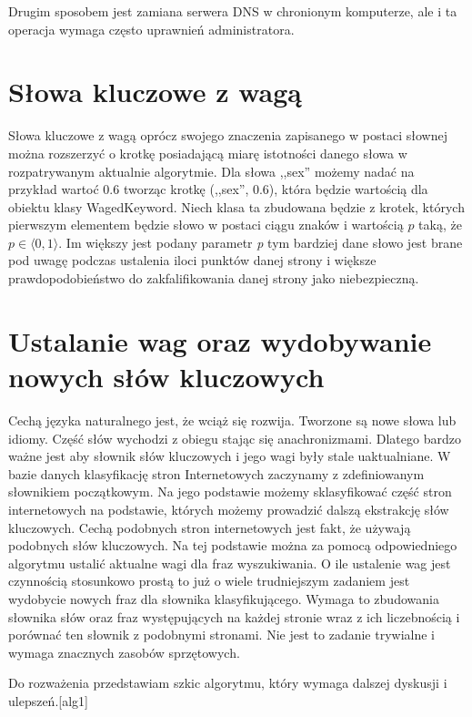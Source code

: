 \documentclass[10pt,twoside,a4paper]{article}
\begin{document}
Drugim sposobem jest zamiana serwera DNS w chronionym komputerze, ale i ta operacja wymaga często uprawnień administratora.
	
\section{Słowa kluczowe z wagą}
Słowa kluczowe z wagą oprócz swojego znaczenia zapisanego w postaci słownej można rozszerzyć o krotkę posiadającą miarę istotności danego słowa w rozpatrywanym aktualnie algorytmie. Dla słowa ,,sex'' możemy nadać na przykład wartoć 0.6 tworząc krotkę (,,sex'', 0.6), która będzie wartością dla obiektu klasy WagedKeyword. Niech klasa ta zbudowana będzie z krotek, których pierwszym elementem będzie słowo w postaci ciągu znaków i wartością \(p\) taką, że \(p \in \langle 0,1\rangle\). Im większy jest podany parametr \textit{p} tym bardziej dane słowo jest brane pod uwagę podczas ustalenia iloci punktów danej strony i większe prawdopodobieństwo do zakfalifikowania danej strony jako niebezpieczną.

\section{Ustalanie wag oraz wydobywanie nowych słów kluczowych}
Cechą języka naturalnego jest, że wciąż się rozwija. Tworzone są nowe słowa lub idiomy. Część słów wychodzi z obiegu stając się anachronizmami. Dlatego bardzo ważne jest aby słownik słów kluczowych i jego wagi były stale uaktualniane. W bazie danych klasyfikację stron Internetowych zaczynamy z zdefiniowanym słownikiem początkowym. Na jego podstawie możemy sklasyfikować część stron internetowych na podstawie, których możemy prowadzić dalszą ekstrakcję słów kluczowych. Cechą podobnych stron internetowych jest fakt, że używają podobnych słów kluczowych. Na tej podstawie można za pomocą odpowiedniego algorytmu ustalić aktualne wagi dla fraz wyszukiwania. O ile ustalenie wag jest czynnością stosunkowo prostą to już o wiele trudniejszym zadaniem jest wydobycie nowych fraz dla słownika klasyfikującego. Wymaga to zbudowania słownika słów oraz fraz występujących na każdej stronie wraz z ich liczebnością i porównać ten słownik z podobnymi stronami. Nie jest to zadanie trywialne i wymaga znacznych zasobów sprzętowych.

Do rozważenia przedstawiam szkic algorytmu, który wymaga dalszej dyskusji i ulepszeń.[alg1] 
\end{document}
